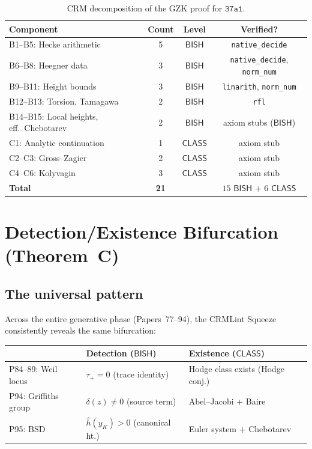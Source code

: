 \documentclass[11pt]{article}
\theoremstyle{plain}
\theoremstyle{definition}
\theoremstyle{remark}
\newcommand{\BISH}{\ensuremath{\mathsf{BISH}}}
\newcommand{\CLASS}{\ensuremath{\mathsf{CLASS}}}
\newcommand{\hhat}{\hat{h}}
\begin{document}
\begin{table}[ht]
\centering
\caption{CRM decomposition of the GZK proof for $\texttt{37a1}$.}\label{tab:crm}
\begin{tabular}{l c c c}
\toprule
Component & Count & Level & Verified? \\
\midrule
B1--B5: Hecke arithmetic & 5 & $\BISH$ & \texttt{native\_decide} \\
B6--B8: Heegner data & 3 & $\BISH$ & \texttt{native\_decide}, \texttt{norm\_num} \\
B9--B11: Height bounds & 3 & $\BISH$ & \texttt{linarith}, \texttt{norm\_num} \\
B12--B13: Torsion, Tamagawa & 2 & $\BISH$ & \texttt{rfl} \\
B14--B15: Local heights, eff.\ Chebotarev & 2 & $\BISH$ & axiom stubs ($\BISH$) \\
\midrule
C1: Analytic continuation & 1 & $\CLASS$ & axiom stub \\
C2--C3: Gross--Zagier & 2 & $\CLASS$ & axiom stub \\
C4--C6: Kolyvagin & 3 & $\CLASS$ & axiom stub \\
\midrule
\textbf{Total} & \textbf{21} & & $15$ $\BISH$ + $6$ $\CLASS$ \\
\bottomrule
\end{tabular}
\end{table}


\section{Detection/Existence Bifurcation (Theorem~C)}
\label{sec:bifurcation}

\subsection{The universal pattern}

Across the entire generative phase (Papers~77--94), the CRMLint Squeeze consistently reveals the same bifurcation:
\begin{center}
\begin{tabular}{lll}
\toprule
& \textbf{Detection} ($\BISH$) & \textbf{Existence} ($\CLASS$) \\
\midrule
P84--89: Weil locus & $\tau_+ = 0$ (trace identity) & Hodge class exists (Hodge conj.)\ \\
P94: Griffiths group & $\delta(z) \neq 0$ (source term) & Abel--Jacobi + Baire \\
P95: BSD & $\hhat(y_K) > 0$ (canonical ht.) & Euler system + Chebotarev \\
\bottomrule
\end{tabular}
\end{center}
\end{document}
